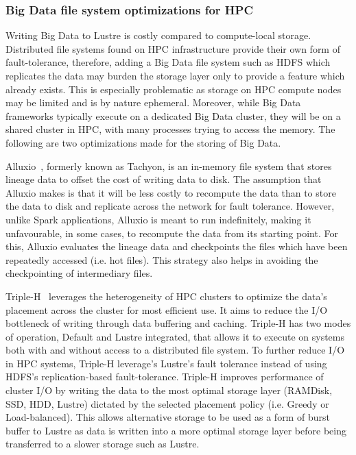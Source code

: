             \subsubsection{Big Data file system optimizations for HPC}

                Writing Big Data to Lustre is costly compared to compute-local
                storage. Distributed file systems found on HPC
                infrastructure provide their own form of fault-tolerance,
                therefore, adding a Big Data file system such as HDFS which
                replicates the data may burden the storage layer only to provide
                a feature which already exists. This is especially problematic
                as storage on HPC compute nodes may be limited and is by nature ephemeral.
                Moreover, while
                Big Data frameworks typically execute on a dedicated Big Data
                cluster, they will be on a shared cluster in HPC, with many
                processes trying to access the memory. The following are two
                optimizations made for the storing of Big Data.

                Alluxio~\cite{Li:2014:TRM:2670979.2670985}, formerly known as
                Tachyon, is an in-memory file system that stores lineage data to
                offset the cost of writing data to disk. The assumption that
                Alluxio makes is that it will be less costly to recompute the
                data than to store the data to disk and replicate across the
                network for fault tolerance. However, unlike Spark applications,
                Alluxio is meant to run indefinitely, making it unfavourable, in
                some cases, to recompute the data from its starting point. For
                this, Alluxio evaluates the lineage data and checkpoints the
                files which have been repeatedly accessed (i.e. hot files). This
                strategy also helps in avoiding the checkpointing of
                intermediary files. 

                Triple-H~\cite{7152476} leverages the heterogeneity of HPC
                clusters to optimize the data's placement across the cluster for
                most efficient use. It aims to reduce the I/O bottleneck of
                writing through data buffering and caching. Triple-H has two
                modes of operation, Default and Lustre integrated, that allows
                it to execute on systems both with and without access to a
                distributed file system. To further reduce I/O in HPC systems,
                Triple-H leverage's Lustre's fault tolerance instead of using
                HDFS's replication-based fault-tolerance. Triple-H improves
                performance of cluster I/O by writing the data to the most
                optimal storage layer (RAMDisk, SSD, HDD, Lustre) dictated by
                the selected placement policy (i.e. Greedy or Load-balanced).
                This allows alternative storage to be used as a form of burst
                buffer to Lustre as data is written into a more optimal storage
                layer before being transferred to a slower storage such as
                Lustre. 

